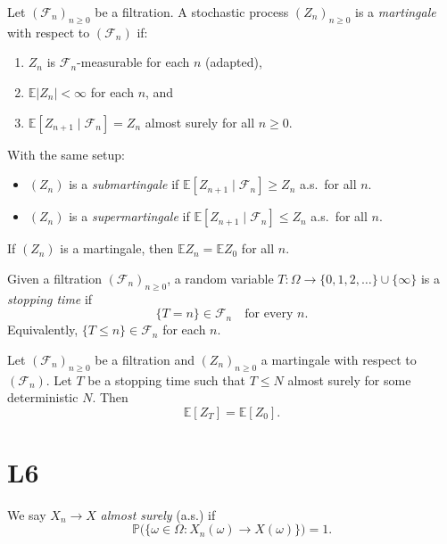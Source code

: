 \documentclass[answers,12pt,addpoints]{exam}
\begin{document}
\begin{definition}[Martingale]
Let $(\mathcal{F}_n)_{n\ge 0}$ be a filtration. A stochastic process $(Z_n)_{n\ge 0}$ is a \emph{martingale} with respect to $(\mathcal{F}_n)$ if:
\begin{enumerate}
  \item $Z_n$ is $\mathcal{F}_n$-measurable for each $n$ (adapted),
  \item $\mathbb{E}|Z_n|<\infty$ for each $n$, and
  \item $\mathbb{E}[Z_{n+1}\mid \mathcal{F}_n] = Z_n$ almost surely for all $n\ge 0$.
\end{enumerate}
\end{definition}

\begin{remark}
With the same setup:
\begin{itemize}
  \item $(Z_n)$ is a \emph{submartingale} if $\mathbb{E}[Z_{n+1}\mid \mathcal{F}_n] \ge Z_n$ a.s.\ for all $n$.
  \item $(Z_n)$ is a \emph{supermartingale} if $\mathbb{E}[Z_{n+1}\mid \mathcal{F}_n] \le Z_n$ a.s.\ for all $n$.
\end{itemize}
If $(Z_n)$ is a martingale, then $\mathbb{E}Z_n = \mathbb{E}Z_0$ for all $n$.
\end{remark}

\begin{definition}
Given a filtration $(\mathcal{F}_n)_{n\ge 0}$, a random variable $T:\Omega\to \{0,1,2,\dots\}\cup\{\infty\}$ is a \emph{stopping time} if
\[
\{T = n\} \in \mathcal{F}_n \quad \text{for every } n.
\]
Equivalently, $\{T\le n\}\in\mathcal{F}_n$ for each $n$.
\end{definition}

\begin{theorem}
Let $(\mathcal{F}_n)_{n\ge 0}$ be a filtration and $(Z_n)_{n\ge 0}$ a martingale with respect to $(\mathcal{F}_n)$. Let $T$ be a stopping time such that $T\le N$ almost surely for some deterministic $N$. Then
\[
\mathbb{E}[Z_T] = \mathbb{E}[Z_0].
\]
\end{theorem}

\section{L6}

\begin{definition}
We say $X_n \to X$ \emph{almost surely} (a.s.) if
\[
\mathbb{P}\big(\{\omega\in\Omega : X_n(\omega)\to X(\omega)\}\big) = 1.
\]
\end{definition}
\end{document}
